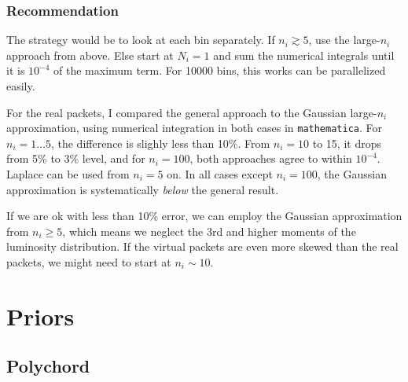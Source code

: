 \documentclass[a4,12pt]{article}
\begin{document}
\subsubsection*{Recommendation}

The strategy would be to look at each bin separately. If $n_i \gtrsim
5$, use the large-$n_i$ approach from above. Else start at $N_i=1$ and
sum the numerical integrals until it is $10^{-4}$ of the maximum
term. For 10000 bins, this works can be parallelized easily.

For the real packets, I compared the general approach to the Gaussian
large-$n_i$ approximation, using numerical integration in both cases
in \texttt{mathematica}. For $n_i=1\dots5$, the difference is slighly
less than 10\%. From $n_i=10$ to 15, it drops from 5\% to 3\% level,
and for $n_i=100$, both approaches agree to within $10^{-4}$. Laplace
can be used from $n_i=5$ on. In all cases except $n_i=100$, the
Gaussian approximation is systematically \emph{below} the general
result.

If we are ok with less than 10\% error, we can employ the Gaussian
approximation from $n_i\ge5$, which means we neglect the 3rd and
higher moments of the luminosity distribution. If the virtual packets
are even more skewed than the real packets, we might need to start at
$n_i \sim 10$.

\section{Priors}

\subsection{Polychord}
\end{document}
